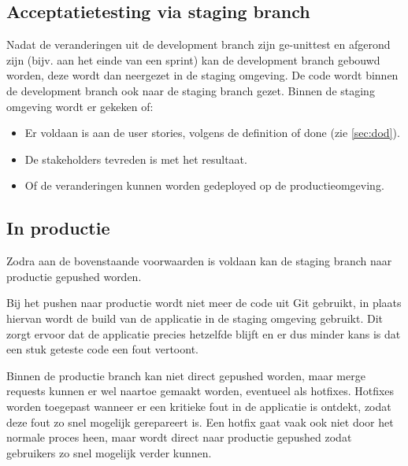 \subsection{Acceptatietesting via staging branch}
Nadat de veranderingen uit de development branch zijn ge-unittest en afgerond zijn (bijv. aan het einde van een sprint) kan de development branch gebouwd worden, deze wordt dan neergezet in de staging omgeving. De code wordt binnen de development branch ook naar de staging branch gezet.
Binnen de staging omgeving wordt er gekeken of:
\begin{itemize}
	\item Er voldaan is aan de user stories, volgens de definition of done (zie \cref{sec:dod}).
	\item De stakeholders tevreden is met het resultaat.
	\item Of de veranderingen kunnen worden gedeployed op de productieomgeving.
\end{itemize}

\subsection{In productie}
Zodra aan de bovenstaande voorwaarden is voldaan kan de staging branch naar productie gepushed worden.
\par
Bij het pushen naar productie wordt niet meer de code uit Git gebruikt, in plaats hiervan wordt de build van de applicatie in de staging omgeving gebruikt.
Dit zorgt ervoor dat de applicatie precies hetzelfde blijft en er dus minder kans is dat een stuk geteste code een fout vertoont.
\par
Binnen de productie branch kan niet direct gepushed worden, maar merge requests kunnen er wel naartoe gemaakt worden, eventueel als hotfixes. Hotfixes worden toegepast wanneer er een kritieke fout in de applicatie is ontdekt, zodat deze fout zo snel mogelijk gerepareert is.
Een hotfix gaat vaak ook niet door het normale proces heen, maar wordt direct naar productie gepushed zodat gebruikers zo snel mogelijk verder kunnen.

\clearpage
